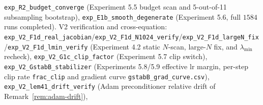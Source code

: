 \documentclass[11pt]{article}
\numberwithin{equation}{section}
\begin{document}
\texttt{exp\_\hspace{0pt}R2\_\hspace{0pt}budget\_\hspace{0pt}converge} (Experiment 5.5 budget scan and 5-out-of-11 subsampling bootstrap), \texttt{exp\_\hspace{0pt}E1b\_\hspace{0pt}smooth\_\hspace{0pt}degenerate} (Experiment 5.6, full $1584$ runs completed). V2 verification and cross-equation: \texttt{exp\_\hspace{0pt}V2\_\hspace{0pt}F1d\_\hspace{0pt}real\_\hspace{0pt}jacobian}/\hspace{0pt}\texttt{exp\_\hspace{0pt}V2\_\hspace{0pt}F1d\_\hspace{0pt}N1024\_\hspace{0pt}verify}/\hspace{0pt}\texttt{exp\_\hspace{0pt}V2\_\hspace{0pt}F1d\_\hspace{0pt}largeN\_\hspace{0pt}fix}/\hspace{0pt}\texttt{exp\_\hspace{0pt}V2\_\hspace{0pt}F1d\_\hspace{0pt}lmin\_\hspace{0pt}verify} (Experiment 4.2 static $N$-scan, large-$N$ fix, and $\lambda_{\min}$ recheck), \texttt{exp\_\hspace{0pt}V2\_\hspace{0pt}G1c\_\hspace{0pt}clip\_\hspace{0pt}factor} (Experiment 5.7 clip switch), \texttt{exp\_\hspace{0pt}V2\_\hspace{0pt}GstabB\_\hspace{0pt}stabilizer} (Experiments 5.8/5.9 effective lr margin, per-step clip rate \texttt{frac\_\hspace{0pt}clip} and gradient curve \texttt{gstabB\_\hspace{0pt}grad\_\hspace{0pt}curve.csv}), \texttt{exp\_\hspace{0pt}V2\_\hspace{0pt}lem41\_\hspace{0pt}drift\_\hspace{0pt}verify} (Adam preconditioner relative drift of Remark~\ref{rem:adam-drift}), 
\end{document}
